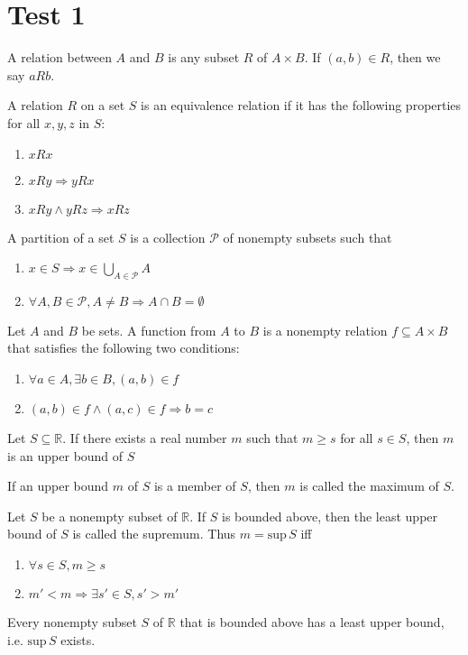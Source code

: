 \documentclass[nobib,notoc]{tufte-handout}
\begin{document}
\section{Test 1}
\begin{defi}[Relation]
	A relation between \(A\) and \(B\) is any subset \(R\) of \(A\times B\). If \((a,b)\in R\), then we say \(aRb\).
\end{defi}
\begin{defi}
	A relation \(R\) on a set \(S\) is an equivalence relation if it has the following properties for all \(x,y,z\) in \(S\):
	\begin{enumerate}
		\item \(xRx\)\qquad{}
		\item \(xRy\Rightarrow yRx\)\qquad{}
		\item \(xRy\wedge yRz\Rightarrow xRz\)\qquad{}
	\end{enumerate}
\end{defi}
A partition of a set \(S\) is a collection \(\mathscr{P}\) of nonempty subsets such that
\begin{enumerate}
	\item \(x\in S\Rightarrow x\in\bigcup_{A\in\mathscr{P}}A\)
	\item \(\forall A,B\in\mathscr{P}, A\neq B\Rightarrow A\cap B=\emptyset\)
\end{enumerate}
\begin{defi}[Function]
	Let \(A\) and \(B\) be sets. A function from \(A\) to \(B\) is a nonempty relation \(f\subseteq A\times B\) that satisfies the following two conditions:
	\begin{enumerate}
		\item \(\forall a\in A,\exists b\in B, (a,b)\in f\)
		\item \((a,b)\in f\wedge (a,c)\in f\Rightarrow b=c\)
	\end{enumerate}
\end{defi}
\begin{defi}
	Let \(S\subseteq\mathbb{R}\). If there exists a real number \(m\) such that \(m\geq s\) for all \(s\in S\), then \(m\) is an upper bound of \(S\)
\end{defi}
\begin{defi}[Maximum]
If an upper bound \(m\) of \(S\) is a member of \(S\), then \(m\) is called the maximum of \(S\).
\end{defi}
\begin{defi}[Supremum]
	Let \(S\) be a nonempty subset of \(\mathbb{R}\). If \(S\) is bounded above, then the least upper bound of \(S\) is called the supremum. Thus \(m=\text{sup}\,S\) iff
	\begin{enumerate}
		\item \(\forall s\in S, m\geq s\)
		\item \(m'<m\Rightarrow \exists s'\in S, s'>m'\)
	\end{enumerate}
\end{defi}
\begin{axiom}
	Every nonempty subset \(S\) of \(\mathbb{R}\) that is bounded above has a least upper bound, i.e. \(\text{sup}\,S\) exists.
\end{axiom}
\end{document}
